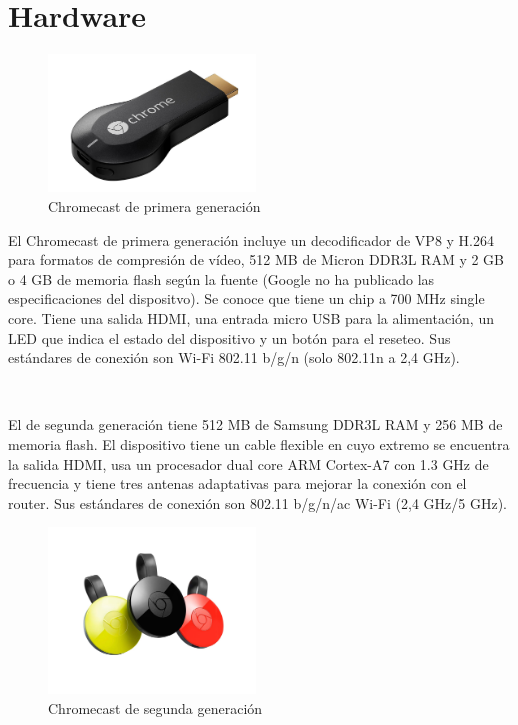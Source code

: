 \section{Hardware}

\begin{figure}[h]
	\centering
	\includegraphics[width=0.49\textwidth]{./Imagenes/chromecast1gen.jpg}
	\caption{Chromecast de primera generación}\label{fig:1gen}
\end{figure}

El Chromecast de primera generación incluye un decodificador de VP8 y H.264 para formatos de compresión de vídeo, 512 MB de Micron DDR3L RAM y 2 GB o 4 GB de memoria flash según la fuente (Google no ha publicado las especificaciones del dispositvo).
Se conoce que tiene un chip a 700 MHz single core.
Tiene una salida HDMI, una entrada micro USB para la alimentación, un LED que indica el estado del dispositivo y un botón para el reseteo.
Sus estándares de conexión son Wi-Fi 802.11 b/g/n (solo 802.11n a 2,4 GHz).

\

El de segunda generación tiene 512 MB de Samsung DDR3L RAM y 256 MB de memoria flash.
El dispositivo tiene un cable flexible en cuyo extremo se encuentra la salida HDMI, usa un procesador dual core ARM Cortex-A7 con 1.3 GHz de frecuencia y tiene tres antenas adaptativas para mejorar la conexión con el router.
Sus estándares de conexión son 802.11 b/g/n/ac Wi-Fi (2,4 GHz/5 GHz).

\begin{figure}[h]
	\centering
	\includegraphics[width=0.49\textwidth]{./Imagenes/Chromecast.jpg}
	\caption{Chromecast de segunda generación}\label{fig:2gen}
\end{figure}

